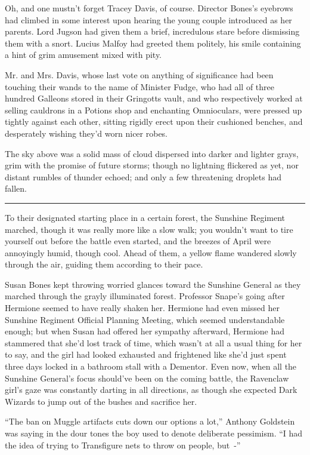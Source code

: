 Oh, and one mustn't forget Tracey Davis, of course. Director Bones's eyebrows had climbed in some interest upon hearing the young couple introduced as her parents. Lord Jugson had given them a brief, incredulous stare before dismissing them with a snort. Lucius Malfoy had greeted them politely, his smile containing a hint of grim amusement mixed with pity.

Mr. and Mrs. Davis, whose last vote on anything of significance had been touching their wands to the name of Minister Fudge, who had all of three hundred Galleons stored in their Gringotts vault, and who respectively worked at selling cauldrons in a Potions shop and enchanting Omnioculars, were pressed up tightly against each other, sitting rigidly erect upon their cushioned benches, and desperately wishing they'd worn nicer robes.

The sky above was a solid mass of cloud dispersed into darker and lighter grays, grim with the promise of future storms; though no lightning flickered as yet, nor distant rumbles of thunder echoed; and only a few threatening droplets had fallen.

\begin{center}\rule{3in}{0.4pt}\end{center}

To their designated starting place in a certain forest, the Sunshine Regiment marched, though it was really more like a slow walk; you wouldn't want to tire yourself out before the battle even started, and the breezes of April were annoyingly humid, though cool. Ahead of them, a yellow flame wandered slowly through the air, guiding them according to their pace.

Susan Bones kept throwing worried glances toward the Sunshine General as they marched through the grayly illuminated forest. Professor Snape's going after Hermione seemed to have really shaken her. Hermione had even missed her Sunshine Regiment Official Planning Meeting, which seemed understandable enough; but when Susan had offered her sympathy afterward, Hermione had stammered that she'd lost track of time, which wasn't at all a usual thing for her to say, and the girl had looked exhausted and frightened like she'd just spent three days locked in a bathroom stall with a Dementor. Even now, when all the Sunshine General's focus should've been on the coming battle, the Ravenclaw girl's gaze was constantly darting in all directions, as though she expected Dark Wizards to jump out of the bushes and sacrifice her.

``The ban on Muggle artifacts cuts down our options a lot,'' Anthony Goldstein was saying in the dour tones the boy used to denote deliberate pessimism. ``I had the idea of trying to Transfigure nets to throw on people, but~-''

